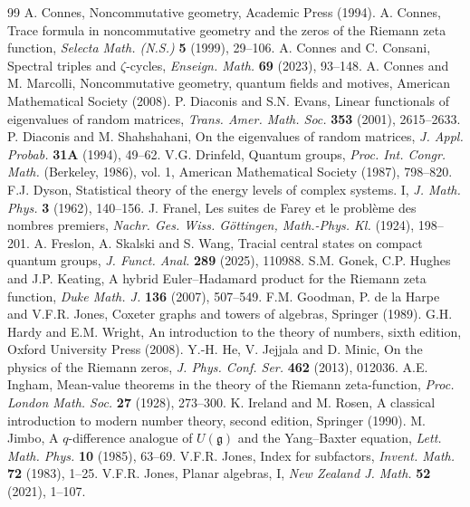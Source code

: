 \documentclass[11pt,a4paper]{article}
\begin{document}
\begin{thebibliography}{99}
 A. Connes, Noncommutative geometry, Academic Press (1994).
 A. Connes, Trace formula in noncommutative geometry and the zeros of the Riemann zeta function, \textit{Selecta Math. (N.S.)} \textbf{5} (1999), 29--106.
 A. Connes and C. Consani, Spectral triples and $\zeta$-cycles, \textit{Enseign. Math.} \textbf{69} (2023), 93--148.
 A. Connes and M. Marcolli, Noncommutative geometry, quantum fields and motives, American Mathematical Society (2008).
 P. Diaconis and S.N. Evans, Linear functionals of eigenvalues of random matrices, \textit{Trans. Amer. Math. Soc.} \textbf{353} (2001), 2615--2633.
 P. Diaconis and M. Shahshahani, On the eigenvalues of random matrices, \textit{J. Appl. Probab.} \textbf{31A} (1994), 49--62.
 V.G. Drinfeld, Quantum groups, \textit{Proc. Int. Congr. Math.} (Berkeley, 1986), vol. 1, American Mathematical Society (1987), 798--820.
 F.J. Dyson, Statistical theory of the energy levels of complex systems. I, \textit{J. Math. Phys.} \textbf{3} (1962), 140--156.
 J. Franel, Les suites de Farey et le probl\`eme des nombres premiers, \textit{Nachr. Ges. Wiss. G\"ottingen, Math.-Phys. Kl.} (1924), 198--201.
 A. Freslon, A. Skalski and S. Wang, Tracial central states on compact quantum groups, \textit{J. Funct. Anal.} \textbf{289} (2025), 110988.
 S.M. Gonek, C.P. Hughes and J.P. Keating, A hybrid Euler--Hadamard product for the Riemann zeta function, \textit{Duke Math. J.} \textbf{136} (2007), 507--549.
 F.M. Goodman, P. de la Harpe and V.F.R. Jones, Coxeter graphs and towers of algebras, Springer (1989).
 G.H. Hardy and E.M. Wright, An introduction to the theory of numbers, sixth edition, Oxford University Press (2008).
 Y.-H. He, V. Jejjala and D. Minic, On the physics of the Riemann zeros, \textit{J. Phys. Conf. Ser.} \textbf{462} (2013), 012036.
 A.E. Ingham, Mean-value theorems in the theory of the Riemann zeta-function, \textit{Proc. London Math. Soc.} \textbf{27} (1928), 273--300.
 K. Ireland and M. Rosen, A classical introduction to modern number theory, second edition, Springer (1990).
 M. Jimbo, A $q$-difference analogue of $U(\mathfrak{g})$ and the Yang--Baxter equation, \textit{Lett. Math. Phys.} \textbf{10} (1985), 63--69.
 V.F.R. Jones, Index for subfactors, \textit{Invent. Math.} \textbf{72} (1983), 1--25.
 V.F.R. Jones, Planar algebras, I, \textit{New Zealand J. Math.} \textbf{52} (2021), 1--107.

\end{thebibliography}
\end{document}
